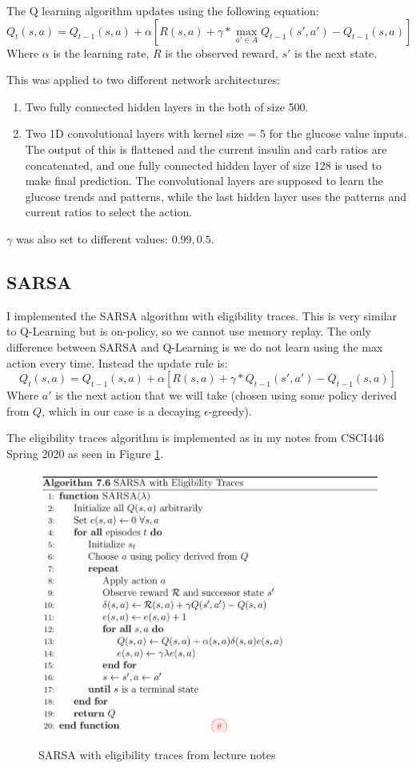 \documentclass[11pt]{article}
\begin{document}
The Q learning algorithm updates using the following equation:
$$Q_t(s,a) = Q_{t-1}(s, a) + \alpha \left[ R(s,a) + \gamma * \max_{a' \in A} Q_{t-1}(s', a') - Q_{t-1}(s,a) \right]$$
Where $\alpha$ is the learning rate, $R$ is the observed reward, $s'$ is the next state.

This was applied to two different network architectures:
\begin{enumerate}
    \item Two fully connected hidden layers in the both of size 500.
    \item Two 1D convolutional layers with kernel size = 5 for the glucose value inputs. 
    The output of this is flattened and the current insulin and carb ratios are concatenated, 
    and one fully connected hidden layer of size 128 is used to make final prediction.
    The convolutional layers are supposed to learn the glucose trends and patterns, while the last hidden layer uses the patterns and current ratios to select the action.
\end{enumerate}

$\gamma$ was also set to different values: $0.99, 0.5$.

\subsection{SARSA}
I implemented the SARSA algorithm with eligibility traces.
This is very similar to Q-Learning but is on-policy, so we cannot use memory replay. 
The only difference between SARSA and Q-Learning is we do not learn using the max action every time. 
Instead the update rule is:
$$Q_t(s,a) = Q_{t-1}(s, a) + \alpha \left[ R(s,a) + \gamma * Q_{t-1}(s', a') - Q_{t-1}(s,a) \right]$$
Where $a'$ is the next action that we will take (chosen using some policy derived from $Q$, which in our case is a decaying $\epsilon$-greedy).

The eligibility traces algorithm is implemented as in my notes from CSCI446 Spring 2020 as seen in Figure \ref{fig:sarsa}.
\begin{figure}[h] 
    \centering
    \includegraphics[width=0.55 \linewidth]{SARSA.png}
    \label{fig:sarsa}
    \caption{SARSA with eligibility traces from lecture notes}
\end{figure}
\end{document}
